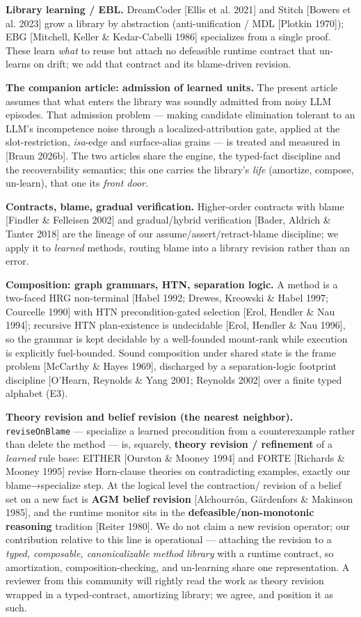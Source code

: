 \documentclass[11pt]{article}
\begin{document}
\textbf{Library learning / EBL.} DreamCoder [Ellis et al. 2021] and Stitch [Bowers et al. 2023] grow a library by abstraction (anti-unification / MDL [Plotkin 1970]); EBG [Mitchell, Keller \& Kedar-Cabelli 1986] specializes from a single proof. These learn \emph{what} to reuse but attach no defeasible runtime contract that un-learns on drift; we add that contract and its blame-driven revision.

\textbf{The companion article: admission of learned units.} The present article assumes that what enters the library was soundly admitted from noisy LLM episodes. That admission problem — making candidate elimination tolerant to an LLM's incompetence noise through a localized-attribution gate, applied at the slot-restriction, \emph{isa}-edge and surface-alias grains — is treated and measured in [Braun 2026b]. The two articles share the engine, the typed-fact discipline and the recoverability semantics; this one carries the library's \emph{life} (amortize, compose, un-learn), that one its \emph{front door}.

\textbf{Contracts, blame, gradual verification.} Higher-order contracts with blame [Findler \& Felleisen 2002] and gradual/hybrid verification [Bader, Aldrich \& Tanter 2018] are the lineage of our assume/assert/retract-blame discipline; we apply it to \emph{learned} methods, routing blame into a library revision rather than an error.

\textbf{Composition: graph grammars, HTN, separation logic.} A method is a two-faced HRG non-terminal [Habel 1992; Drewes, Kreowski \& Habel 1997; Courcelle 1990] with HTN precondition-gated selection [Erol, Hendler \& Nau 1994]; recursive HTN plan-existence is undecidable [Erol, Hendler \& Nau 1996], so the grammar is kept decidable by a well-founded mount-rank while execution is explicitly fuel-bounded. Sound composition under shared state is the frame problem [McCarthy \& Hayes 1969], discharged by a separation-logic footprint discipline [O'Hearn, Reynolds \& Yang 2001; Reynolds 2002] over a finite typed alphabet (E3).

\textbf{Theory revision and belief revision (the nearest neighbor).} \texttt{reviseOnBlame} — specialize a learned precondition from a counterexample rather than delete the method — is, squarely, \textbf{theory revision / refinement} of a \emph{learned} rule base: EITHER [Ourston \& Mooney 1994] and FORTE [Richards \& Mooney 1995] revise Horn-clause theories on contradicting examples, exactly our blame→specialize step. At the logical level the contraction/ revision of a belief set on a new fact is \textbf{AGM belief revision} [Alchourrón, Gärdenfors \& Makinson 1985], and the runtime monitor sits in the \textbf{defeasible/non-monotonic reasoning} tradition [Reiter 1980]. We do not claim a new revision operator; our contribution relative to this line is operational — attaching the revision to a \emph{typed, composable, canonicalizable method library} with a runtime contract, so amortization, composition-checking, and un-learning share one representation. A reviewer from this community will rightly read the work as theory revision wrapped in a typed-contract, amortizing library; we agree, and position it as such.
\end{document}
